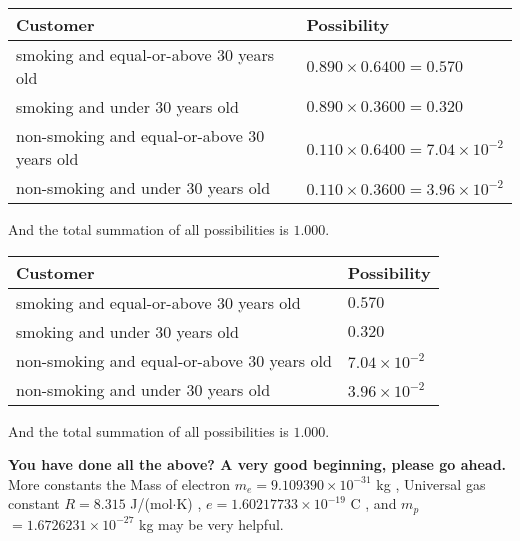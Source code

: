 \documentclass[12pt]{article}
\begin{document}
\noindent
\begin{tabular}{|l|l|}
\hline
Customer & Possibility \\
\hline
smoking  and  %
equal-or-above 30 years old  &
  $ %
0.890 \times  %
0.6400 =  %
0.570$ \\
\hline
smoking  and  %
under 30 years old &
  $ %
0.890 \times  %
0.3600 =  %
0.320$ \\
\hline
 non-smoking and  %
equal-or-above 30 years old  &
  $ %
0.110 \times  %
0.6400 =  %
7.04 \times 10^{-2}$ \\
\hline
 non-smoking and  %
under 30 years old &
  $ %
0.110 \times  %
0.3600 =  %
3.96 \times 10^{-2}$ \\
\hline
\end{tabular}
 
\noindent
And the total summation of all possibilities is $  %
1.000 $.
 
 
 
 
 
 
\noindent{}

 
\noindent
\begin{tabular}{|l|l|}
\hline
Customer & Possibility \\
\hline
smoking  and  %
equal-or-above 30 years old &
  $ %
0.570$ \\
\hline
smoking  and  %
under 30 years old &
  $ %
0.320$ \\
\hline
 non-smoking and  %
equal-or-above 30 years old &
  $ %
7.04 \times 10^{-2}$ \\
\hline
 non-smoking and  %
under 30 years old &
  $ %
3.96 \times 10^{-2}$ \\
\hline
\end{tabular}
 
\noindent
 And the total summation of all possibilities is $  %
1.000 $.
 
 
 
   
   
\vspace{0.3in}
{\textbf{\LARGE{You have done all the above? A very good beginning, please go ahead.}}}
More constants the
Mass of electron
$m_e$$ =
9.109390 \times 10^{-31} $
kg
,
Universal gas constant
$R$$ =
8.315 $
J/(mol$\cdot $K)
,
$e$$ =
1.60217733 \times 10^{-19} $
C
, and
$m_p$$ =
1.6726231 \times 10^{-27} $
kg
%
may be very helpful.
\vspace{0.3in}
   
   
  
\end{document}
